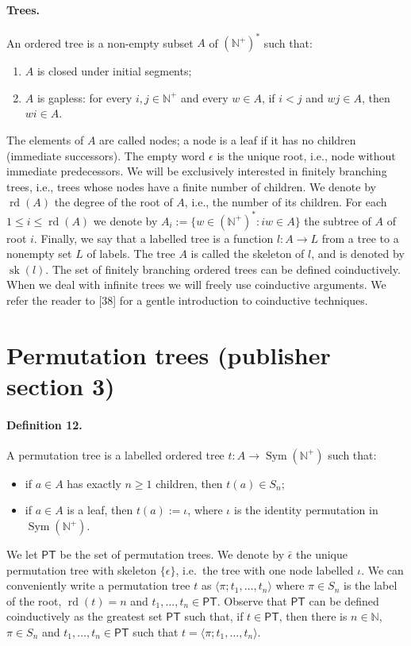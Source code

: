 \documentclass[10pt,a4paper]{amsart}
\begin{document}
\paragraph{Trees.} An ordered tree is a non-empty subset $A$ of $(\mathbb N^+)^*$ such that:
\begin{enumerate}
\item[(i)] $A$ is closed under initial segments;
\item[(ii)] $A$ is gapless: for every $i,j\in\mathbb N^+$ and every $w\in A$, if $i<j$ and $wj\in A$, then $wi\in A$.
\end{enumerate}
The elements of $A$ are called nodes; a node is a leaf if it has no children (immediate successors).
The empty word $\epsilon$ is the unique root, i.e., node without immediate predecessors.
We will be exclusively interested in finitely branching trees, i.e., trees whose nodes have a finite number of children.
We denote by $\operatorname{rd}(A)$ the degree of the root of $A$, i.e., the number of its children.
For each $1\le i\le\operatorname{rd}(A)$ we denote by $A_i:=\{w\in(\mathbb N^+)^*:iw\in A\}$ the subtree of $A$ of root $i$.
Finally, we say that a labelled tree is a function $l:A\to L$ from a tree to a nonempty set $L$ of labels. The tree $A$ is called the skeleton of $l$, and is denoted by $\operatorname{sk}(l)$. The set of finitely branching ordered trees can be defined coinductively. When we deal with infinite trees we will freely use coinductive arguments. We refer the reader to [38] for a gentle introduction to coinductive techniques.

\section*{Permutation trees (publisher section 3)}
\paragraph{Definition 12.} A permutation tree is a labelled ordered tree $t:A\to\operatorname{Sym}(\mathbb N^+)$ such that:
\begin{itemize}
\item if $a\in A$ has exactly $n\ge1$ children, then $t(a)\in S_n$;
\item if $a\in A$ is a leaf, then $t(a):=\iota$, where $\iota$ is the identity permutation in $\operatorname{Sym}(\mathbb N^+)$.
\end{itemize}
We let $\mathsf{PT}$ be the set of permutation trees.
We denote by $\bar\epsilon$ the unique permutation tree with skeleton $\{\epsilon\}$, i.e.\ the tree with one node labelled $\iota$.
We can conveniently write a permutation tree $t$ as $\langle\pi;t_1,\ldots,t_n\rangle$ where $\pi\in S_n$ is the label of the root, $\operatorname{rd}(t)=n$ and $t_1,\ldots,t_n\in\mathsf{PT}$.
Observe that $\mathsf{PT}$ can be defined coinductively as the greatest set $\mathsf{PT}$ such that, if $t\in\mathsf{PT}$, then there is $n\in\mathbb N$, $\pi\in S_n$ and $t_1,\ldots,t_n\in\mathsf{PT}$ such that $t=\langle\pi;t_1,\ldots,t_n\rangle$.
\end{document}
